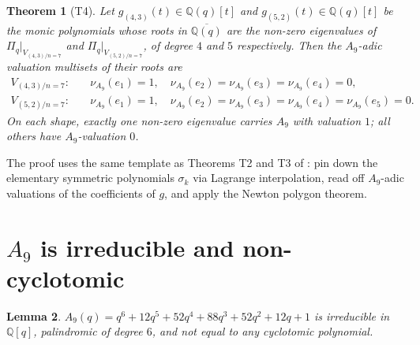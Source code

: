\documentclass[11pt]{article}
\theoremstyle{plain}
\newtheorem{theorem}{Theorem}
\newtheorem{lemma}[theorem]{Lemma}
\theoremstyle{definition}
\theoremstyle{remark}
\newcommand{\Q}{\mathbb{Q}}
\newcommand{\Pibs}{\Pi_q}
\newcommand{\valA}{\nu_{A_9}}
\begin{document}
\begin{theorem}[T4]
\label{thm:T4}
Let $g_{(4,3)}(t) \in \Q(q)[t]$ and $g_{(5,2)}(t) \in \Q(q)[t]$ be the monic
polynomials whose roots in $\overline{\Q(q)}$ are the non-zero eigenvalues of
$\Pibs|_{V_{(4,3)/n=7}}$ and $\Pibs|_{V_{(5,2)/n=7}}$, of degree $4$ and $5$
respectively.  Then the $A_9$-adic valuation multisets of their roots are
\begin{align*}
V_{(4,3)/n=7}: \quad &\valA(e_1) = 1, \quad \valA(e_2) = \valA(e_3) = \valA(e_4) = 0, \\
V_{(5,2)/n=7}: \quad &\valA(e_1) = 1, \quad \valA(e_2) = \valA(e_3) = \valA(e_4) = \valA(e_5) = 0.
\end{align*}
On each shape, exactly one non-zero eigenvalue carries $A_9$ with valuation $1$;
all others have $A_9$-valuation $0$.
\end{theorem}

The proof uses the same template as Theorems T2 and T3 of \cite{Newton28}: pin
down the elementary symmetric polynomials $\sigma_k$ via Lagrange interpolation,
read off $A_9$-adic valuations of the coefficients of $g$, and apply the Newton
polygon theorem.

\section{$A_9$ is irreducible and non-cyclotomic}
\label{sec:irreducibility}

\begin{lemma}
\label{lem:A9-irreducible}
$A_9(q) = q^6 + 12q^5 + 52q^4 + 88q^3 + 52q^2 + 12q + 1$ is irreducible in
$\Q[q]$, palindromic of degree $6$, and not equal to any cyclotomic polynomial.
\end{lemma}
\end{document}
